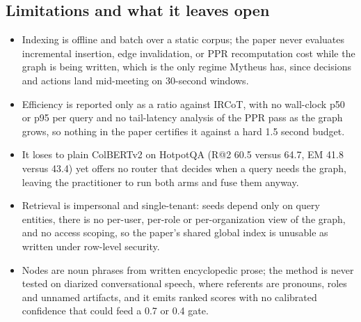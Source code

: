 \subsection{Limitations and what it leaves open}
\begin{itemize}[leftmargin=1.2em, itemsep=1pt, topsep=2pt]
  \item Indexing is offline and batch over a static corpus; the paper never evaluates incremental insertion, edge invalidation, or PPR recomputation cost while the graph is being written, which is the only regime Mytheus has, since decisions and actions land mid-meeting on 30-second windows.
  \item Efficiency is reported only as a ratio against IRCoT, with no wall-clock p50 or p95 per query and no tail-latency analysis of the PPR pass as the graph grows, so nothing in the paper certifies it against a hard 1.5 second budget.
  \item It loses to plain ColBERTv2 on HotpotQA (R@2 60.5 versus 64.7, EM 41.8 versus 43.4) yet offers no router that decides when a query needs the graph, leaving the practitioner to run both arms and fuse them anyway.
  \item Retrieval is impersonal and single-tenant: seeds depend only on query entities, there is no per-user, per-role or per-organization view of the graph, and no access scoping, so the paper's shared global index is unusable as written under row-level security.
  \item Nodes are noun phrases from written encyclopedic prose; the method is never tested on diarized conversational speech, where referents are pronouns, roles and unnamed artifacts, and it emits ranked scores with no calibrated confidence that could feed a 0.7 or 0.4 gate.
\end{itemize}
